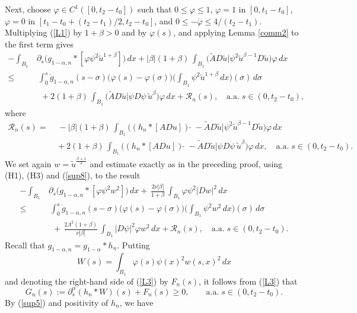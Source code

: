 \documentclass[10pt]{article}
\begin{document}
Next, choose $\varphi\in C^1([0,t_2-t_0])$ such that $0\le
\varphi\le 1$, $\varphi=1$ in $[0,t_1-t_0]$, $\varphi=0$ in
$[t_1-t_0+(t_2-t_1)/2,t_2-t_0]$, and $0\le -\dot{\varphi}\le
4/(t_2-t_1)$. Multiplying (\ref{L1}) by $1+\beta>0$ and by
$\varphi(s)$, and applying Lemma \ref{comm2} to the first term
gives
\begin{align}
-\int_{B_1}  &
\partial_{s}(g_{1-\alpha,n}\ast
[\varphi\psi^2\tilde{u}^{1+\beta}]\big)\,dx+|\beta|(1+\beta)\,
\int_{B_1}\big(\tilde{A}D\tilde{u}|\psi^2 \tilde{u}^{\beta-1}D
\tilde{u}\big)\varphi\,dx \nonumber\\
\le & \,\int_0^s
\dot{g}_{1-\alpha,n}(s-\sigma)\big(\varphi(s)-\varphi(\sigma)\big)
\big(\int_{B_1}\psi^2\tilde{u}^{1+\beta}\,dx\big)(\sigma)\,d\sigma\nonumber\\
& \;\,+2(1+\beta)\,\int_{B_1}\big(\tilde{A}D\tilde{u}|\psi D\psi
\,\tilde{u}^{\beta}\big)\varphi\,dx+\mathcal{R}_n(s) ,\quad
\mbox{a.a.}\;s\in(0,t_2-t_0), \label{L2}
\end{align}
where
\begin{align*}
\mathcal{R}_n(s)= &\,\,-|\beta|(1+\beta)\, \int_{B_1}\big((h_n\ast
[ADu])\,\tilde{}\;-\tilde{A}D\tilde{u}|\psi^2 \tilde{u}^{\beta-1}D
\tilde{u}\big)\varphi\,dx\\
&\,+2(1+\beta)\,\int_{B_1}\big((h_n\ast
[ADu])\,\tilde{}\;-\tilde{A}D\tilde{u}|\psi D\psi
\,\tilde{u}^{\beta}\big)\varphi\,dx,\quad
\mbox{a.a.}\;s\in(0,t_2-t_0).
\end{align*}
We set again $w=\tilde{u}^{\frac{\beta+1}{2}}$ and estimate
exactly as in the preceding proof, using (H1), (H3) and
(\ref{sup8}), to the result
\begin{align}
-\int_{B_1}  &
\partial_{s}(g_{1-\alpha,n}\ast
[\varphi\psi^2w^2]\big)\,dx+\,\frac{2\nu
|\beta|}{1+\beta}\,\int_{B_1}\varphi
\psi^2|Dw|^2\,dx \nonumber\\
\le & \,\int_0^s
\dot{g}_{1-\alpha,n}(s-\sigma)\big(\varphi(s)-\varphi(\sigma)\big)
\big(\int_{B_1}\psi^2w^2\,dx\big)(\sigma)\,d\sigma\nonumber\\
& \;\,+\,\frac{2\Lambda^2(1+\beta)}{\nu |\beta|}\, \int_{B_1}
|D\psi|^2\varphi w^2\,dx+\mathcal{R}_n(s) ,\quad
\mbox{a.a.}\;s\in(0,t_2-t_0). \label{L3}
\end{align}
Recall that $g_{1-\alpha,n}=g_{1-\alpha}\ast h_n$. Putting
\[
W(s)=\int_{B_1}\varphi(s)\psi(x)^2w(s,x)^2\,dx
\]
and denoting the right-hand side of (\ref{L3}) by $F_n(s)$, it
follows from (\ref{L3}) that
\[
G_n(s):=\partial_s^\alpha (h_n\ast W)(s)+F_n(s)\ge 0,\quad\quad
\mbox{a.a.}\;s\in(0,t_2-t_0).
\]
By (\ref{sup5}) and positivity of $h_n$, we have
\end{document}
